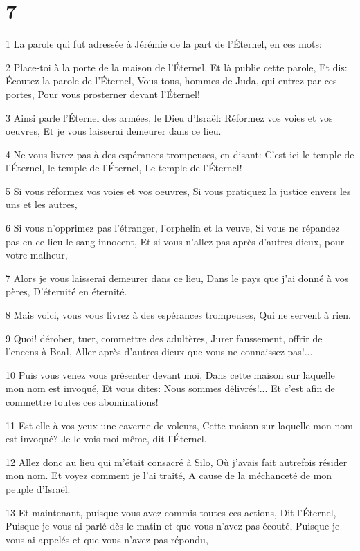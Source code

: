 \chapter{7}

\par 1 La parole qui fut adressée à Jérémie de la part de l'Éternel, en ces mots:
\par 2 Place-toi à la porte de la maison de l'Éternel, Et là publie cette parole, Et dis: Écoutez la parole de l'Éternel, Vous tous, hommes de Juda, qui entrez par ces portes, Pour vous prosterner devant l'Éternel!
\par 3 Ainsi parle l'Éternel des armées, le Dieu d'Israël: Réformez vos voies et vos oeuvres, Et je vous laisserai demeurer dans ce lieu.
\par 4 Ne vous livrez pas à des espérances trompeuses, en disant: C'est ici le temple de l'Éternel, le temple de l'Éternel, Le temple de l'Éternel!
\par 5 Si vous réformez vos voies et vos oeuvres, Si vous pratiquez la justice envers les uns et les autres,
\par 6 Si vous n'opprimez pas l'étranger, l'orphelin et la veuve, Si vous ne répandez pas en ce lieu le sang innocent, Et si vous n'allez pas après d'autres dieux, pour votre malheur,
\par 7 Alors je vous laisserai demeurer dans ce lieu, Dans le pays que j'ai donné à vos pères, D'éternité en éternité.
\par 8 Mais voici, vous vous livrez à des espérances trompeuses, Qui ne servent à rien.
\par 9 Quoi! dérober, tuer, commettre des adultères, Jurer faussement, offrir de l'encens à Baal, Aller après d'autres dieux que vous ne connaissez pas!...
\par 10 Puis vous venez vous présenter devant moi, Dans cette maison sur laquelle mon nom est invoqué, Et vous dites: Nous sommes délivrés!... Et c'est afin de commettre toutes ces abominations!
\par 11 Est-elle à vos yeux une caverne de voleurs, Cette maison sur laquelle mon nom est invoqué? Je le vois moi-même, dit l'Éternel.
\par 12 Allez donc au lieu qui m'était consacré à Silo, Où j'avais fait autrefois résider mon nom. Et voyez comment je l'ai traité, A cause de la méchanceté de mon peuple d'Israël.
\par 13 Et maintenant, puisque vous avez commis toutes ces actions, Dit l'Éternel, Puisque je vous ai parlé dès le matin et que vous n'avez pas écouté, Puisque je vous ai appelés et que vous n'avez pas répondu,
